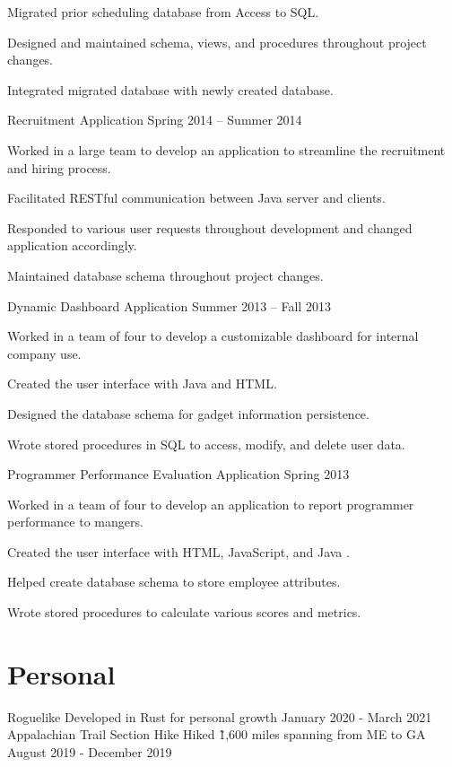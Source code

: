 \documentclass{marvinkassabian_resume}
\begin{document}
						\item Migrated prior scheduling database from Access to SQL.
						\item Designed and maintained schema, views, and procedures throughout project changes.
						\item Integrated migrated database with newly created database.
					\resumesublistend
				\item[] \subsectiondate
						{Recruitment Application}
						{Spring 2014 – Summer 2014}
					\resumesublistbegin
						\item Worked in a large team to develop an application to streamline the recruitment and hiring process.
						\item Facilitated RESTful communication between Java server and clients.
						\item Responded to various user requests throughout development and changed application accordingly.
						\item Maintained database schema throughout project changes.
					\resumesublistend
				\item[] \subsectiondate
						{Dynamic Dashboard Application}
						{Summer 2013 – Fall 2013}
					\resumesublistbegin
						\item Worked in a team of four to develop a customizable dashboard for internal company use.
						\item Created the user interface with Java and HTML.
						\item Designed the database schema for gadget information persistence.
						\item Wrote stored procedures in SQL to access, modify, and delete user data.
					\resumesublistend
				\item[] \subsectiondate
						{Programmer Performance Evaluation Application}
						{Spring 2013}
					\resumesublistbegin
						\item Worked in a team of four to develop an application to report programmer performance to mangers.
						\item Created the user interface with HTML, JavaScript, and Java .
						\item Helped create database schema to store employee attributes.
						\item Wrote stored procedures to calculate various scores and metrics.
					\resumesublistend
			\resumesublistend
	\section{Personal}
		\subsectionlocationdate
				{Roguelike}
				{Developed in Rust for personal growth}
				{January 2020 - March 2021}
		\subsectionlocationdate
				{Appalachian Trail Section Hike}
				{Hiked \~1,600 miles spanning from ME to GA}
				{August 2019 - December 2019}
\end{document}
